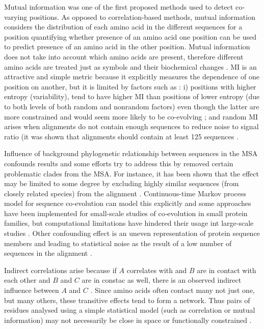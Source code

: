 Mutual information was one of the first proposed methods used to detect co‐varying positions. 
As opposed to correlation‐based methods, mutual information considers the distribution of each amino acid in the different sequences for a position quantifying whether presence of an amino acid one position can be used to predict presence of an amino acid in the other position.
Mutual information does not take into account which amino acids are present, therefore different amino acids are treated just as symbols and their biochemical changes \cite{de2013emerging}.
MI is an attractive and simple metric because it explicitly measures the dependence of one position on another, but it is limited by factors such as \cite{dunn2008mutual}: i) positions with higher entropy (variability), tend to have higher MI than positions of lower entropy (due to both levels of both random and nonrandom factors) even though the latter are more constrained and would seem more likely to be co-evolving \cite{dunn2008mutual}; and random MI arises when alignments do not contain enough sequences to reduce noise to signal ratio (it was shown that alignments should contain at least 125 sequences \cite{dunn2008mutual:REF(Martin et al., 2005)}.

Influence of background phylogenetic relationship between sequences in the MSA confounds results and some efforts try to address this by 
removed certain problematic clades from the MSA.
For instance, it has been shown that the effect may be limited to some degree by excluding highly similar sequences (from closely related species) from the alignment \cite{dunn2008mutual:REF (Wollenberg and Atchley, 2000), (Martin et al., 2005; Tillier and Lui, 2003)}.
Continuous-time Markov process model for sequence co‐evolution can model this explicitly and some approaches have been implemented for small‐scale studies of co‐evolution in small protein families, but computational limitations have hindered their usage int large‐scale studies \cite{de2013emerging}.
Other confounding effect is an uneven representation of protein sequence members and leading to statistical noise as the result of a low number of sequences in the alignment \cite{marks2012protein}.

Indirect correlations arise because 	if $A$ correlates with and $B$ are in contact with each other and $B$ and $C$ are in constac as well, there is an observed indirect influence between $A$ and $C$ \cite{marks2012protein}.
Since amino acids often contact many not just one, but many others, these transitive effects tend to form a network.
Thus pairs of residues analysed using a simple statistical model (such as correlation or mutual information) may not necessarily be close in space or functionally constrained \cite{marks2012protein}.

